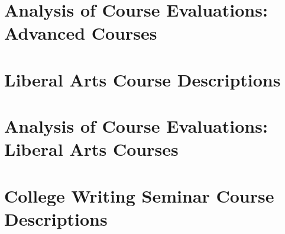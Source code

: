 \documentclass[../../main.tex]{subfiles}
\begin{document}
\begin{flushleft}

\end{flushleft}

\section{Analysis of Course Evaluations: Advanced Courses}
\label{sec:adv_eval}

%

\begin{flushleft}

\end{flushleft}

\section{Liberal Arts Course Descriptions}
\label{sec:lib}

%

\begin{flushleft}

\end{flushleft}

\section{Analysis of Course Evaluations: Liberal Arts Courses}
\label{sec:lib_eval}
%

\begin{flushleft}

\end{flushleft}

\section{College Writing Seminar Course Descriptions}
\label{sec:writing}

%
\end{document}
